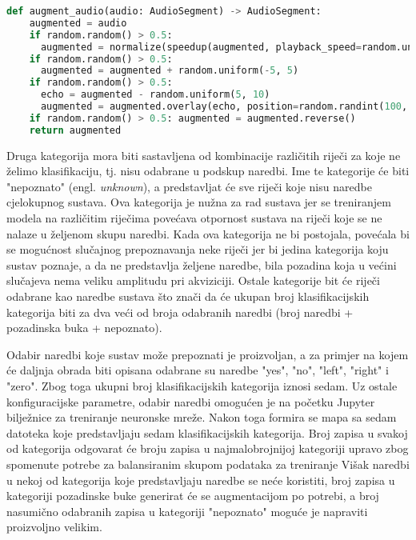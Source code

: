\begin{lstlisting}[language=Python, caption=Augmentacija zvuka, label=code:augmentation]
def augment_audio(audio: AudioSegment) -> AudioSegment:
    augmented = audio
    if random.random() > 0.5:
      augmented = normalize(speedup(augmented, playback_speed=random.uniform(1.1, 1.5)))
    if random.random() > 0.5:
      augmented = augmented + random.uniform(-5, 5)
    if random.random() > 0.5:
      echo = augmented - random.uniform(5, 10) 
      augmented = augmented.overlay(echo, position=random.randint(100, 500))
    if random.random() > 0.5: augmented = augmented.reverse()
    return augmented
\end{lstlisting}


Druga kategorija mora biti sastavljena od kombinacije različitih riječi za koje
ne želimo klasifikaciju, tj. nisu odabrane u podskup naredbi. Ime te kategorije
će biti "nepoznato" (engl. \textit{unknown}), a predstavljat će sve riječi koje nisu
naredbe cjelokupnog sustava. Ova kategorija je nužna za rad sustava jer 
se treniranjem modela na različitim riječima povećava otpornost sustava na riječi
koje se ne nalaze u željenom skupu naredbi. Kada ova kategorija ne bi postojala,
povećala bi se mogućnost slučajnog prepoznavanja neke riječi jer bi jedina kategorija
koju sustav poznaje, a da ne predstavlja željene naredbe, bila pozadina koja
u većini slučajeva nema veliku amplitudu pri akviziciji. 
Ostale kategorije bit će riječi odabrane kao naredbe
sustava što  znači da će ukupan broj klasifikacijskih kategorija biti za dva veći 
od broja odabranih naredbi (broj naredbi + pozadinska buka + nepoznato).

Odabir naredbi koje sustav može prepoznati je proizvoljan, a za primjer na kojem
će daljnja obrada biti opisana odabrane su naredbe "yes", "no", "left", "right" i 
"zero". Zbog toga ukupni broj
klasifikacijskih kategorija iznosi sedam. Uz ostale konfiguracijske parametre,
odabir naredbi omogućen je na početku Jupyter bilježnice za treniranje neuronske mreže.
Nakon toga formira se mapa sa sedam datoteka koje predstavljaju sedam klasifikacijskih
kategorija.
Broj zapisa u svakoj od kategorija odgovarat će broju zapisa u najmalobrojnijoj 
kategoriji upravo zbog spomenute potrebe za balansiranim skupom podataka za treniranje
Višak naredbi u nekoj od kategorija koje predstavljaju naredbe se neće koristiti, broj
zapisa u kategoriji pozadinske buke generirat će se augmentacijom po potrebi, a broj
nasumično odabranih zapisa u kategoriji "nepoznato" moguće je napraviti proizvoljno
velikim.

